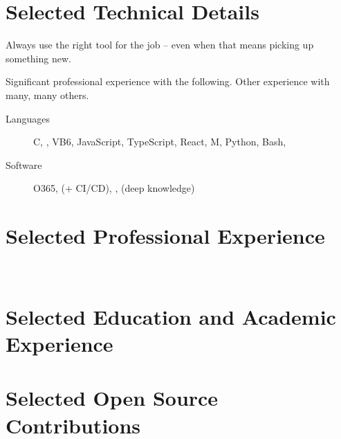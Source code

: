 \documentclass{simplecv}
\newif\ifgithub
\begin{document}
\maketitle
\vfill
\section{Selected Technical Details}
\begin{minipage}{\textwidth}
  Always use the right tool for the job -- even when that means
  picking up something new.

  Significant professional experience with the following. Other
  experience with many, many others.

  \begin{description}
  \item[Languages] C, \CSharp, VB6, JavaScript, TypeScript, React, M,
    Python, Bash, ~\Lisp
  \item[Software] O365,  (+ CI/CD), ,  (deep knowledge)
  \end{description}

  \smallskip


\end{minipage}

\vspace{-4ex}
\section{Selected Professional Experience}

\vfill
\newpage~
\section{Selected Education and Academic Experience}

\ifgithub
\vfill
\section{Selected Open Source Contributions}
\end{document}
